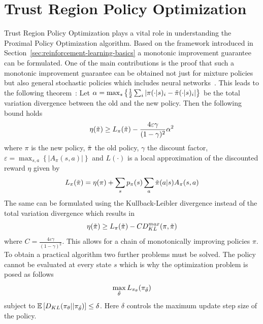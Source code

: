 \section{Trust Region Policy Optimization}\label{sec:trust-region-policy-optimization}
Trust Region Policy Optimization plays a vital role in understanding the Proximal Policy Optimization algorithm.
Based on the framework introduced in Section~\ref{sec:reinforcement-learning-basics} a monotonic improvement guarantee can be formulated.
One of the main contributions is the proof that such a monotonic improvement guarantee can be obtained not just for mixture policies but
also general stochastic policies which includes neural networks~\cite{Schulman2015TrustRP}.
This leads to the following theorem~\cite{Schulman2015TrustRP}:
Let $\alpha=\max_s\left \{ \frac{1}{2} \sum_i |\pi(\cdot|s)_i - \Tilde{\pi}(\cdot|s)_i| \right\}$ be the total variation divergence between
the old and the new policy.
Then the following bound holds
\begin{equation}
    \eta(\Tilde{\pi}) \geq L_{\pi}(\Tilde{\pi}) - \frac{4\varepsilon\gamma}{(1-\gamma)^2}\alpha^2
\end{equation}
where $\pi$ is the new policy, $\Tilde{\pi}$ the old policy, $\gamma$ the discount factor,
$\varepsilon = \max_{s,a} \left\{ |A_\pi(s,a)| \right\}$ and $L(\cdot)$ is a local approximation of the
discounted reward $\eta$ given by
\begin{equation}
    L_{\pi}(\Tilde{\pi}) = \eta(\pi) + \sum_s p_{\pi}(s) \sum_a \Tilde{\pi}(a|s) A_{\pi}(s, a)
\end{equation}
The same can be formulated using the Kullback-Leibler divergence instead of the total variation divergence which results in~\cite{Schulman2015TrustRP}
\begin{equation}
    \eta(\Tilde{\pi}) \geq L_{\pi}(\Tilde{\pi}) - C D_{KL}^{max}(\pi, \Tilde{\pi})
\end{equation}
where $C = \frac{4\varepsilon\gamma}{(1-\gamma)^2}$.
This allows for a chain of monotonically improving policies $\pi$.
To obtain a practical algorithm two further problems must be solved.
The policy cannot be evaluated at every state $s$ which is why the optimization problem is posed as follows
\begin{equation}
    \max_{\Tilde{\theta}} L_{\pi_{\theta}}(\pi_{\Tilde{\theta}})
\end{equation}
subject to $\mathbb{E}\left[ D_{KL}(\pi_\theta || \pi_{\Tilde{\theta}}) \right] \leq \delta$.
Here $\delta$ controls the maximum update step size of the policy.
